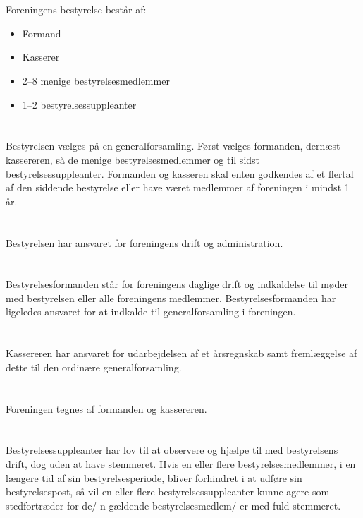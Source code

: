 \documentclass[danish,a4paper,twocolumn,oneside,article]{memoir}
\begin{document}
\section{} Foreningens bestyrelse består af:

\begin{itemize}
\item Formand
\item Kasserer
\item 2--8 menige bestyrelsesmedlemmer
\item 1--2 bestyrelsessuppleanter
\end{itemize}

\section{} Bestyrelsen vælges på en generalforsamling. Først vælges formanden, dernæst kassereren, så de menige
bestyrelsesmedlemmer og til sidst bestyrelsessuppleanter. Formanden og kasseren skal enten godkendes af et flertal
af den siddende bestyrelse eller have været medlemmer af foreningen i mindst 1 år.

\section{} Bestyrelsen har ansvaret for foreningens drift og administration.

\section{} Bestyrelsesformanden står for foreningens daglige drift og indkaldelse til møder med bestyrelsen
eller alle foreningens medlemmer. Bestyrelsesformanden har ligeledes ansvaret for at indkalde til
generalforsamling i foreningen.

\section{} Kassereren har ansvaret for udarbejdelsen af et årsregnskab samt fremlæggelse af dette til den
ordinære generalforsamling.

\section{} Foreningen tegnes af formanden og kassereren.

\section{} Bestyrelsessuppleanter har lov til at observere og hjælpe til med bestyrelsens drift, dog uden at have stemmeret.
Hvis en eller flere bestyrelsesmedlemmer, i en længere tid af sin bestyrelsesperiode, bliver forhindret i at udføre sin bestyrelsespost,
så vil en eller flere bestyrelsessuppleanter kunne agere som stedfortræder for de/-n gældende bestyrelsesmedlem/-er med fuld stemmeret.
\end{document}
